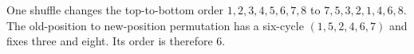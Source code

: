 One shuffle changes the top-to-bottom order $1,2,3,4,5,6,7,8$ to $7,5,3,2,1,4,6,8$. The old-position to new-position permutation has a six-cycle $(1,5,2,4,6,7)$ and fixes three and eight. Its order is therefore $\boxed6$.
